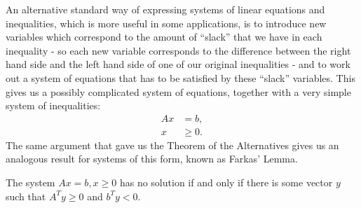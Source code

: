 An alternative standard way of expressing systems of linear equations and inequalities, which is more useful in some applications, is to introduce new variables which correspond to the amount of ``slack'' that we have in each inequality - so each new variable corresponds to the difference between the right hand side and the left hand side of one of our original inequalities - and to work out a system of equations that has to be satisfied by these ``slack'' variables. This gives us a possibly complicated system of equations, together with a very simple system of inequalities:
\begin{align*}
Ax &= b,\\
x &\ge 0.
\end{align*}
The same argument that gave us the Theorem of the Alternatives gives us an analogous result for systems of this form, known as Farkas' Lemma.

\begin{lem} The system $Ax = b, x \ge 0$ has no solution if and only if there is some vector $y$ such that $A^Ty \ge 0$ and $b^Ty < 0$.
\end{lem}

